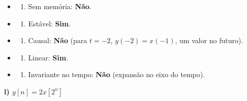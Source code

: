 \begin{itemize}
\tightlist
\item
  \begin{enumerate}
  \def\labelenumi{(\roman{enumi})}
  \tightlist
  \item
    Sem memória: \textbf{Não}.
  \end{enumerate}
\item
  \begin{enumerate}
  \def\labelenumi{(\roman{enumi})}
  \setcounter{enumi}{1}
  \tightlist
  \item
    Estável: \textbf{Sim}.
  \end{enumerate}
\item
  \begin{enumerate}
  \def\labelenumi{(\roman{enumi})}
  \setcounter{enumi}{2}
  \tightlist
  \item
    Causal: \textbf{Não} (para \(t=-2\), \(y(-2) = x(-1)\), um valor no futuro).
  \end{enumerate}
\item
  \begin{enumerate}
  \def\labelenumi{(\roman{enumi})}
  \setcounter{enumi}{3}
  \tightlist
  \item
    Linear: \textbf{Sim}.
  \end{enumerate}
\item
  \begin{enumerate}
  \def\labelenumi{(\alph{enumi})}
  \setcounter{enumi}{21}
  \tightlist
  \item
    Invariante no tempo: \textbf{Não} (expansão no eixo do tempo).
  \end{enumerate}
\end{itemize}

\textbf{l) \(y[n] = 2x[2^n]\)}

